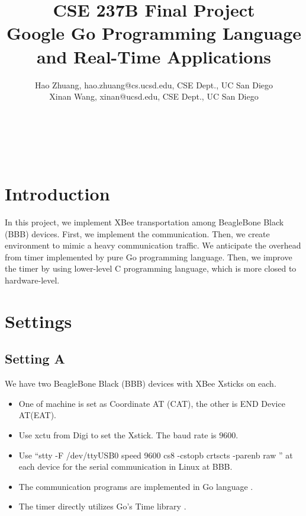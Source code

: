 \documentclass[a4paper,12pt]{article}
\makeatletter
\newcommand{\linia}{\rule{\linewidth}{0.5pt}}
\theoremstyle{mytheor}
\renewcommand{\maketitle}{
	\begin{center}
		{\Large {\@title}}
	 	\vspace{1ex}
	\\
	\centering \@author \\
  \@date
	  \vspace{-0.3cm}%
	\end{center}
}
\makeatother
\begin{document}
	
\title{CSE 237B Final Project \\ Google Go Programming Language and Real-Time Applications} 
    
\author{Hao Zhuang, hao.zhuang@cs.ucsd.edu, CSE Dept., UC San Diego\\
Xinan Wang, xinan@ucsd.edu, CSE Dept., UC San Diego}
 
\maketitle 
\vspace{0.1in} 

 
\section{Introduction} 

In this project, we implement XBee transportation among BeagleBone Black (BBB) devices.
First, we implement the communication.
Then, we create environment to mimic a heavy communication traffic. We anticipate the overhead from timer implemented by pure Go programming language.  
Then, we improve the timer by using lower-level C programming language, which is more closed to hardware-level. 

\section{Settings}
\subsection{Setting A} 

We have two BeagleBone Black (BBB) \cite{bbb} devices with XBee Xsticks on each. 
\begin{itemize} 
\item  One of machine is set as Coordinate AT (CAT), the other is END Device AT(EAT). 
\item  Use xctu \cite{xctu} from Digi to set the Xstick. The baud rate is $9600$. 
\item  Use 
``stty -F /dev/ttyUSB0 speed 9600 cs8 -cstopb crtscts -parenb raw  ''
at each device  for the serial communication in Linux at BBB. 
\item 
The communication programs are implemented in Go language \cite{go}.
\item 
The timer directly utilizes Go's Time library \cite{gotimer}.  
\end{itemize} 
\end{document}
